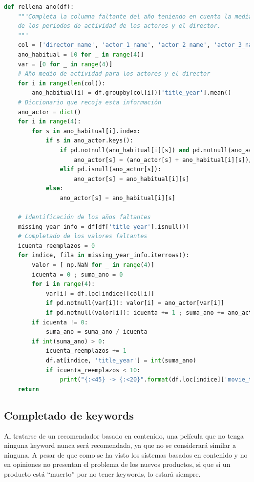\begin{lstlisting}[language=Python, caption={Completado de la variable año en el dataset utilizando el promedio de los años de las películas de su director y actores principales.}]
def rellena_ano(df):
    """Completa la columna faltante del año teniendo en cuenta la media
    de los periodos de actividad de los actores y el director.
    """
    col = ['director_name', 'actor_1_name', 'actor_2_name', 'actor_3_name']
    ano_habitual = [0 for _ in range(4)]
    var = [0 for _ in range(4)]
    # Año medio de actividad para los actores y el director
    for i in range(len(col)):
        ano_habitual[i] = df.groupby(col[i])['title_year'].mean()
    # Diccionario que recoja esta información
    ano_actor = dict()
    for i in range(4):
        for s in ano_habitual[i].index:
            if s in ano_actor.keys():
                if pd.notnull(ano_habitual[i][s]) and pd.notnull(ano_actor[s]):
                    ano_actor[s] = (ano_actor[s] + ano_habitual[i][s])/2
                elif pd.isnull(ano_actor[s]):
                    ano_actor[s] = ano_habitual[i][s]
            else:
                ano_actor[s] = ano_habitual[i][s]
        
    # Identificación de los años faltantes
    missing_year_info = df[df['title_year'].isnull()]
    # Completado de los valores faltantes
    icuenta_reemplazos = 0
    for indice, fila in missing_year_info.iterrows():
        valor = [ np.NaN for _ in range(4)]
        icuenta = 0 ; suma_ano = 0
        for i in range(4):            
            var[i] = df.loc[indice][col[i]]
            if pd.notnull(var[i]): valor[i] = ano_actor[var[i]]
            if pd.notnull(valor[i]): icuenta += 1 ; suma_ano += ano_actor[var[i]]
        if icuenta != 0: 
            suma_ano = suma_ano / icuenta 
        if int(suma_ano) > 0:
            icuenta_reemplazos += 1
            df.at[indice, 'title_year'] = int(suma_ano)
            if icuenta_reemplazos < 10: 
                print("{:<45} -> {:<20}".format(df.loc[indice]['movie_title'],int(suma_ano)))
    return
\end{lstlisting}


\subsection{Completado de keywords}

Al tratarse de un recomendador basado en contenido, una película que no tenga ninguna keyword nunca será recomendada, ya que no se considerará similar a ninguna. A pesar de que como se ha visto los sistemas basados en contenido y no en opiniones no presentan el problema de los nuevos productos, si que si un producto está ``muerto'' por no tener keywords, lo estará siempre.\\

